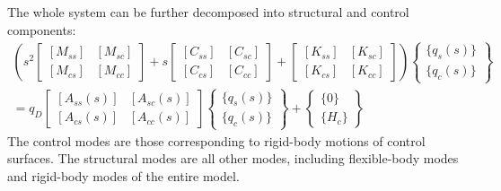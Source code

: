 The whole system can be further decomposed into structural and control components:
\begin{multline}
    \left( s^2 \begin{bmatrix}
        [M_{ss}] & [M_{sc}] \\
        [M_{cs}] & [M_{cc}]
    \end{bmatrix} + s \begin{bmatrix}
        [C_{ss}] & [C_{sc}] \\
        [C_{cs}] & [C_{cc}]
    \end{bmatrix} + \begin{bmatrix}
        [K_{ss}] & [K_{sc}] \\
        [K_{cs}] & [K_{cc}]
    \end{bmatrix} \right) \begin{Bmatrix}
        \{q_s(s)\} \\
        \{q_c(s)\}
    \end{Bmatrix} \\ = q_D \begin{bmatrix}
        [A_{ss}(s)] & [A_{sc}(s)] \\
        [A_{cs}(s)] & [A_{cc}(s)]
    \end{bmatrix} \begin{Bmatrix}
        \{q_s(s)\} \\
        \{q_c(s)\}
    \end{Bmatrix}
    + \begin{Bmatrix}
        \{0\} \\
        \{H_c\}
    \end{Bmatrix}
\end{multline}
The control modes are those corresponding to rigid-body motions of control surfaces. The structural modes are all other modes, including flexible-body modes and rigid-body modes of the entire model.

